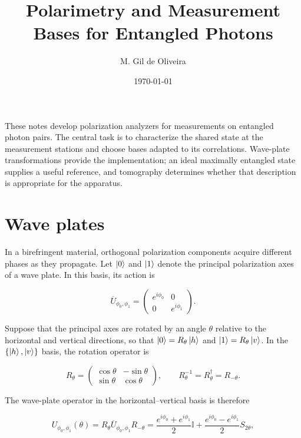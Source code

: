 \documentclass[a4paper,10pt]{article}
\title{Polarimetry and Measurement Bases for Entangled Photons}
\author{M. Gil de Oliveira}
\date{\today}
\newcommand{\I}{\mathbb{I}}
\begin{document}
\maketitle

These notes develop polarization analyzers for measurements on entangled
photon pairs. The central task is to characterize the shared state at the
measurement stations and choose bases adapted to its correlations.
Wave-plate transformations provide the implementation; an ideal maximally
entangled state supplies a useful reference, and tomography determines
whether that description is appropriate for the apparatus.

\section{Wave plates}

In a birefringent material, orthogonal polarization components acquire
different phases as they propagate. Let $\ket{0}$ and $\ket{1}$ denote the
principal polarization axes of a wave plate. In this basis, its action is

\begin{equation}
    \overline{U}_{\phi_0,\phi_1}
    =
    \begin{pmatrix}
        e^{i\phi_0} & 0 \\
        0 & e^{i\phi_1}
    \end{pmatrix}.
    \label{eq:wave-plate-principal-basis}
\end{equation}

Suppose that the principal axes are rotated by an angle $\theta$ relative to
the horizontal and vertical directions, so that
$\ket{0}=R_\theta\ket{h}$ and $\ket{1}=R_\theta\ket{v}$. In the
$\{\ket{h},\ket{v}\}$ basis, the rotation operator is

\begin{equation}
    R_\theta
    =
    \begin{pmatrix}
        \cos\theta & -\sin\theta \\
        \sin\theta & \cos\theta
    \end{pmatrix},
    \qquad
    R_\theta^{-1}=R_\theta^\dagger=R_{-\theta}.
    \label{eq:rotation}
\end{equation}

The wave-plate operator in the horizontal--vertical basis is therefore

\begin{equation}
    U_{\phi_0,\phi_1}(\theta)
    =R_\theta\overline{U}_{\phi_0,\phi_1}R_{-\theta}
    =\frac{e^{i\phi_0}+e^{i\phi_1}}{2}\I
    +\frac{e^{i\phi_0}-e^{i\phi_1}}{2}S_{2\theta},
    \label{eq:general-wave-plate}
\end{equation}
\end{document}
